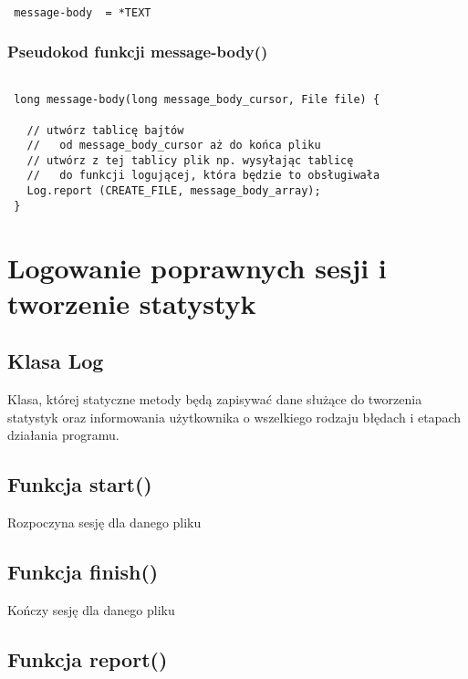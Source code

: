 \documentclass[a4paper,11pt]{report}
\begin{document}
\begin{lstlisting}

 message-body  = *TEXT

\end{lstlisting}

\subsubsection{Pseudokod funkcji message-body()}

\begin{lstlisting}

 long message-body(long message_body_cursor, File file) {
 
   // utwórz tablicę bajtów 
   //   od message_body_cursor aż do końca pliku
   // utwórz z tej tablicy plik np. wysyłając tablicę 
   //   do funkcji logującej, która będzie to obsługiwała
   Log.report (CREATE_FILE, message_body_array);
 } 

\end{lstlisting}

\section{Logowanie poprawnych sesji i tworzenie statystyk}

\subsection{Klasa Log}

Klasa, której statyczne metody będą zapisywać dane służące do tworzenia statystyk oraz informowania użytkownika o wszelkiego rodzaju błędach i etapach działania programu.

\subsection{Funkcja start()}

Rozpoczyna sesję dla danego pliku

\subsection{Funkcja finish()}

Kończy sesję dla danego pliku

\subsection{Funkcja report()}
\end{document}
